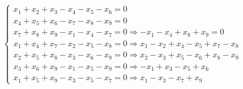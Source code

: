 \begin{align*}
  \begin{cases}
    x_1 + x_2 + x_3 - x_4 - x_5 - x_6 = 0                                               \\
    x_4 + x_5 + x_6 - x_7 - x_8 - x_9 = 0                                               \\
    x_7 + x_8 + x_9 - x_1 - x_4 - x_7 = 0 \Rightarrow -x_1 -x_4 +x_8 +x_9 = 0           \\
    x_1 + x_4 + x_7 - x_2 - x_5 - x_8 = 0 \Rightarrow x_1 - x_2 + x_4 - x_5 + x_7 - x_8 \\
    x_2 + x_5 + x_8 - x_3 - x_6 - x_9 = 0 \Rightarrow x_2 - x_3 + x_5 - x_6 + x_8 - x_9 \\
    x_3 + x_6 + x_9 - x_1 - x_5 - x_9 = 0 \Rightarrow - x_1 + x_3 - x_5 + x_6           \\
    x_1 + x_5 + x_9 - x_3 - x_5 - x_7 = 0 \Rightarrow x_1 - x_3 - x_7 + x_9
  \end{cases} \\
\end{align*}

